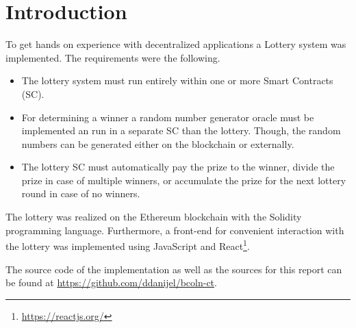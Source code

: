 \chapter{Introduction}

To get hands on experience with decentralized applications a Lottery system was
implemented. The requirements were the following.
\begin{itemize}
    \item The lottery system must run entirely within one or more Smart
    Contracts (SC).
    \item For determining a winner a random number generator oracle must be
    implemented an run in a separate SC than the lottery. Though, the random
    numbers can be generated either on the blockchain or externally.
    \item The lottery SC must automatically pay the prize to the winner, divide
    the prize in case of multiple winners, or accumulate the prize for the next
    lottery round in case of no winners. 
\end{itemize}

The lottery was realized on the Ethereum blockchain with the Solidity
programming language. Furthermore, a front-end for convenient interaction with
the lottery was implemented using JavaScript and React\footnote{\url{https://reactjs.org/}}. 

The source code of the implementation as well as the sources for this report can
be found at \url{https://github.com/ddanijel/bcoln-ct}.
